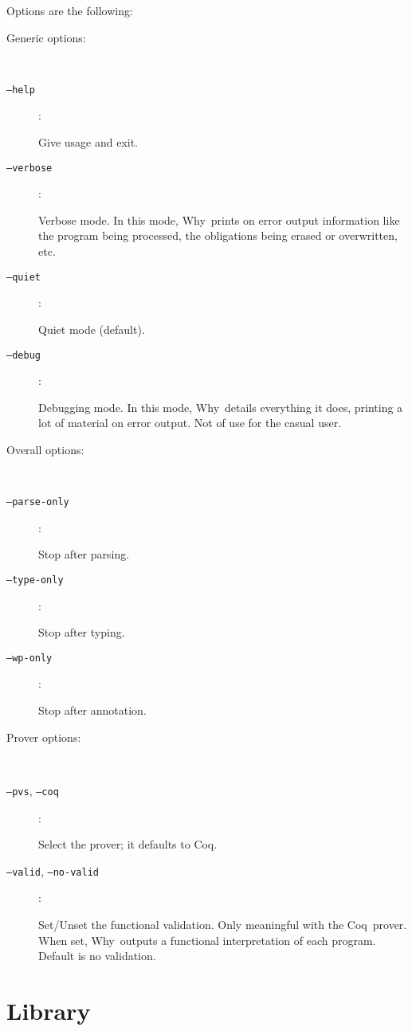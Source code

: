 \documentclass[a4paper,12pt]{report}
\newcommand{\coq}{\textsf{Coq}}
\newcommand{\why}{\textsf{Why}}
\begin{document}
Options are the following:
\begin{description}
  \item[Generic options:] ~\par
  \item[\texttt{--help}]: ~\par    
    Give usage and exit. 
  \item[\texttt{--verbose}]: ~\par 
    Verbose mode. In this mode, \why\ prints on error output
    information like the program being processed, the obligations
    being erased or overwritten, etc.
  \item[\texttt{--quiet}]: ~\par  
    Quiet mode (default).
  \item[\texttt{--debug}]: ~\par 
    Debugging mode. In this mode, \why\ details everything it does,
    printing a lot of material on error output. Not of use for the
    casual user.

  \item[Overall options:] ~\par
  \item[\texttt{--parse-only}]: ~\par  
    Stop after parsing.
  \item[\texttt{--type-only}]:  ~\par  
    Stop after typing.
  \item[\texttt{--wp-only}]:    ~\par  
    Stop after annotation.

  \item[Prover options:] ~\par
  \item[\texttt{--pvs}, \texttt{--coq}]: ~\par 
    Select the prover; it defaults to \coq.
  \item[\texttt{--valid}, \texttt{--no-valid}]: ~\par
    Set/Unset the functional validation. Only meaningful with the
    \coq\ prover. When set, \why\ outputs a functional interpretation
    of each program. Default is no validation. 
\end{description}


\section{Library}
\label{library}
\end{document}
